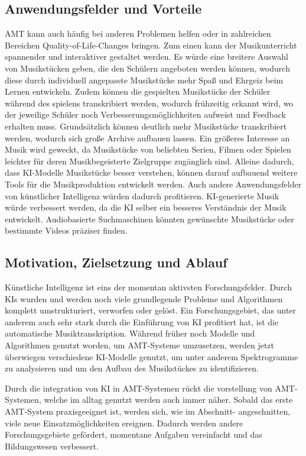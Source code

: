 \subsection{Anwendungsfelder und Vorteile}\label{subsec:praktisch}
AMT kann auch häufig bei anderen Problemen helfen
oder in zahlreichen Bereichen Quality-of-Life-Changes bringen.
Zum einen kann der Musikunterricht spannender und interaktiver gestaltet werden.
Es würde eine breitere Auswahl von Musikstücken geben, die den Schülern angeboten werden können,
wodurch diese durch individuell angepasste Musikstücke mehr Spaß und Ehrgeiz beim Lernen entwickeln.
Zudem können die gespielten Musikstücke der Schüler während des spielens transkribiert werden,
wodurch frühzeitig erkannt wird, wo der jeweilige Schüler noch Verbesserungsmöglichkeiten aufweist und Feedback erhalten muss.
Grundsätzlich können deutlich mehr Musikstücke transkribiert werden,
wodurch sich große Archive aufbauen lassen.
Ein größeres Interesse an Musik wird geweckt, da Musikstücke von beliebten Serien, Filmen oder Spielen
leichter für deren Musikbegeisterte Zielgruppe zugänglich sind.
Alleine dadurch, dass KI-Modelle Musikstücke besser verstehen,
können darauf aufbauend weitere Tools für die Musikproduktion entwickelt werden.
Auch andere Anwendungsfelder von künstlicher Intelligenz würden dadurch profitieren.
KI-generierte Musik würde verbessert werden, da die KI selber ein besseres Verständnis der Musik entwickelt.
Audiobasierte Suchmaschinen könnten gewünschte Musikstücke oder bestimmte Videos präziser finden.

\subsection{Motivation, Zielsetzung und Ablauf}
Künstliche Intelligenz ist eins der momentan aktivsten Forschungsfelder.
Durch KIs wurden und werden noch viele grundlegende Probleme
und Algorithmen komplett umstrukturiert, verworfen oder gelöst.
Ein Forschungsgebiet, das unter anderem auch sehr stark durch die Einführung von KI profitiert hat,
ist die automatische Musiktranskription.
Während früher noch Modelle und Algorithmen genutzt worden, um AMT-Systeme umzusetzen,
werden jetzt überwiegen verschiedene KI-Modelle genutzt,
um unter anderem Spektrogramme zu analysieren und um den Aufbau des Musikstückes zu identifizieren.

Durch die integration von KI in AMT-Systemen rückt die vorstellung von AMT-Systemen,
welche im alltag genutzt werden auch immer näher.
Sobald das erste AMT-System praxisgeeignet ist, werden sich, wie im Abschnitt- angeschnitten,
viele neue Einsatzmöglichkeiten ereignen.
Dadurch werden andere Forschungsgebiete gefördert, momentane Aufgaben vereinfacht und das Bildungswesen verbessert.

